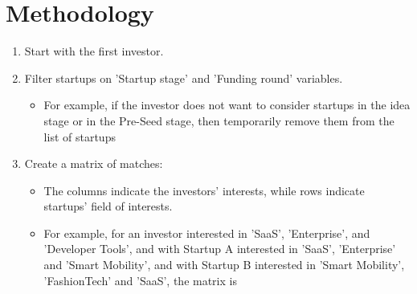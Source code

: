 \documentclass{article}
\begin{document}
\section*{Methodology}
\begin{enumerate}
\itemsep-0.3em 
\item Start with the first investor.
\item Filter startups on 'Startup stage' and 'Funding round' variables. \begin{itemize} 
\itemsep-0.3em 
\item For example, if the investor does not want to consider startups in the idea stage or in the Pre-Seed stage, then temporarily remove them from the list of startups   \end{itemize}
\item Create a matrix of matches: \begin{itemize} \itemsep-0.3em 
\item The columns indicate the investors' interests, while rows indicate startups' field of interests. 
\item For example, for an investor interested in 'SaaS', 'Enterprise', and 'Developer Tools', and with Startup A interested in 'SaaS', 'Enterprise' and 'Smart Mobility', and with Startup B interested in 'Smart Mobility', 'FashionTech' and 'SaaS', the matrix is\\


\end{itemize}
\end{enumerate}
\end{document}
